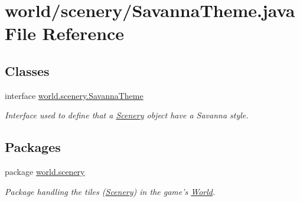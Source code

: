\hypertarget{a00069}{\section{world/scenery/\-Savanna\-Theme.java File Reference}
\label{a00069}
}
\subsection*{Classes}
\begin{DoxyCompactItemize}
\item 
interface \hyperlink{a00023}{world.\-scenery.\-Savanna\-Theme}
\begin{DoxyCompactList}\small\item\em Interface used to define that a \hyperlink{a00024}{Scenery} object have a Savanna style. \end{DoxyCompactList}\end{DoxyCompactItemize}
\subsection*{Packages}
\begin{DoxyCompactItemize}
\item 
package \hyperlink{a00091}{world.\-scenery}
\begin{DoxyCompactList}\small\item\em Package handling the tiles (\hyperlink{a00024}{Scenery}) in the game's \hyperlink{a00039}{World}. \end{DoxyCompactList}\end{DoxyCompactItemize}
